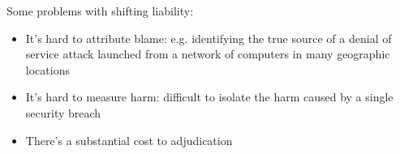 Some problems with shifting liability:
	\begin{itemize}
		\item It's hard to attribute blame: e.g. identifying the true source of a denial of service attack launched from a network of computers in many geographic locations
		\item It's hard to measure harm: difficult to isolate the harm caused by a single security breach
		\item There's a substantial cost to adjudication
	\end{itemize}

